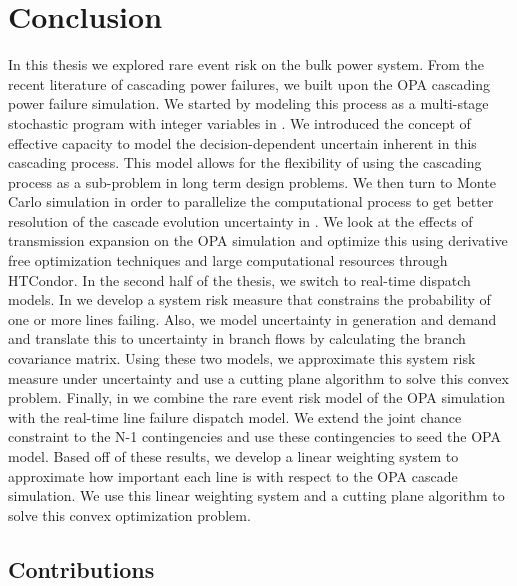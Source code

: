 
\chapter{Conclusion}
In this thesis we explored rare event risk on the bulk power system.  From the recent literature of cascading power failures, we built upon the OPA cascading power failure simulation.  We started by modeling this process as a multi-stage stochastic program with integer variables in .  We introduced the concept of effective capacity to model the decision-dependent uncertain inherent in this cascading process.  This model allows for the flexibility of using the cascading process as a sub-problem in long term design problems.  We then turn to Monte Carlo simulation in order to parallelize the computational process to get better resolution of the cascade evolution uncertainty in .  We look at the effects of transmission expansion on the OPA simulation and optimize this using derivative free optimization techniques and large computational resources through HTCondor.  In the second half of the thesis, we switch to real-time dispatch models.  In  we develop a system risk measure that constrains the probability of one or more lines failing.  Also, we model uncertainty in generation and demand and translate this to uncertainty in branch flows by calculating the branch covariance matrix.  Using these two models, we approximate this system risk measure under uncertainty and use a cutting plane algorithm to solve this convex problem.  Finally, in  we combine the rare event risk model of the OPA simulation with the real-time line failure dispatch model.  We extend the joint chance constraint to the N-1 contingencies and use these contingencies to seed the OPA model.  Based off of these results, we develop a linear weighting system to approximate how important each line is with respect to the OPA cascade simulation.  We use this linear weighting system and a cutting plane algorithm to solve this convex optimization problem.







\section{Contributions}
